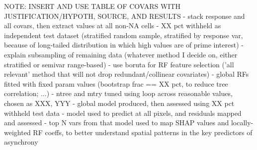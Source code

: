 \documentclass[9pt,twocolumn,twoside,lineno]{pnas-new}
\begin{document}
{NOTE: INSERT AND USE TABLE OF COVARS WITH JUSTIFICATION/HYPOTH, SOURCE, AND RESULTS
- stack response and all covars, then extract values at all non-NA cells
- XX pct withheld as independent test dataset (stratified random sample, stratified by response var, because of long-tailed distribution in which high values are of prime interest)
- explain subsampling of remaining data (whatever method I decide on, either stratified or semivar range-based)
- use boruta for RF feature selection ('all relevant' method that will not drop redundant/collinear covariates)
- global RFs fitted with fixed param values (bootstrap frac == XX pct, to reduce tree correlation; ...)
- ntree and mtry tuned using loop across reasonable values, chosen as XXX, YYY
- global model produced, then assessed using XX pct withheld test data
- model used to predict at all pixels, and residuals mapped and assessed
- top N vars from that model used to map SHAP values and locally-weighted RF coeffs, to better understand spatial patterns in the key predictors of asynchrony



} %

\showmatmethods{} %


\showacknow{} %


\end{document}
